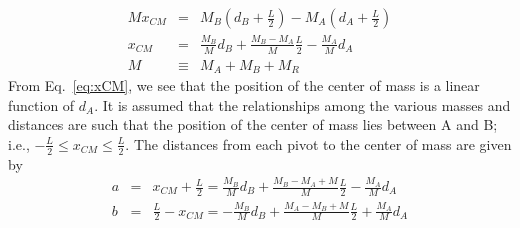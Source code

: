 \documentclass{revtex4}
\begin{document}
\begin{eqnarray}
  M x_{CM} &=& M_B (d_B + \frac{L}{2}) - M_A (d_A + \frac{L}{2} ) \nonumber \\
  x_{CM} &=& \frac{M_B}{M} d_B + \frac{M_B -M_A}{M}\frac{L}{2} - \frac{M_A}{M}d_A \label{eq:xCM} \\ 
  M &\equiv& M_A + M_B + M_R \nonumber 
\end{eqnarray}
From Eq.~\eqref{eq:xCM}, we see that the position of the center of mass is a linear function of $d_A$. It is assumed that the relationships among the various masses and distances are such that the position of the center of mass lies between A and B; i.e., $-\frac{L}{2} \le x_{CM} \le \frac{L}{2}$. The distances from each pivot to the center of mass are given by
\begin{eqnarray}
  a &=& x_{CM} + \frac{L}{2} = \frac{M_B}{M} d_B + \frac{M_B - M_A + M}{M}\frac{L}{2} - \frac{M_A}{M} d_A \nonumber \\
  b &=& \frac{L}{2} - x_{CM} = -\frac{M_B}{M}d_B + \frac{M_A - M_B + M}{M} \frac{L}{2} + \frac{M_A}{M} d_A
\end{eqnarray}
\end{document}
